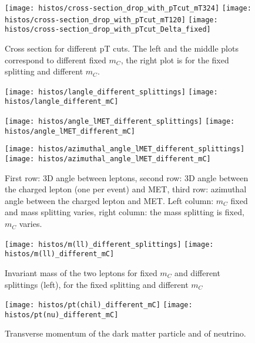 \documentclass[10pt,letterpaper,notitlepage]{article}
\begin{document}
\begin{figure}[H]
\centering

\texttt{[image: histos/cross-section\_drop\_with\_pTcut\_mT324]}
\texttt{[image: histos/cross-section\_drop\_with\_pTcut\_mT120]}
\texttt{[image: histos/cross-section\_drop\_with\_pTcut\_Delta\_fixed]}

\caption{\label{fig:sigma-pTcut}Cross section for different pT cuts. The left and the middle plots correspond to different fixed $m_C$, the right plot is for the fixed splitting and different $m_C$.}
\end{figure}


\begin{figure}[H]
\centering

\texttt{[image: histos/langle\_different\_splittings]}
\texttt{[image: histos/langle\_different\_mC]}

\texttt{[image: histos/angle\_lMET\_different\_splittings]}
\texttt{[image: histos/angle\_lMET\_different\_mC]}

\texttt{[image: histos/azimuthal\_angle\_lMET\_different\_splittings]}
\texttt{[image: histos/azimuthal\_angle\_lMET\_different\_mC]}


\caption{\label{fig:angles}First row: 3D angle between leptons, second row: 3D angle between the charged lepton (one per event) and MET, third row: azimuthal angle between the charged lepton and MET. Left column: $m_C$ fixed and mass splitting varies, right column: the mass splitting is fixed, $m_C$ varies.}
\end{figure}



\begin{figure}[H]
\centering

\texttt{[image: histos/m(ll)\_different\_splittings]}
\texttt{[image: histos/m(ll)\_different\_mC]}

\caption{\label{fig:inv-mass}Invariant mass of the two leptons for fixed $m_C$ and different splittings (left), for the fixed splitting and different $m_C$}
\end{figure}



\begin{figure}[H]
\centering

\texttt{[image: histos/pt(chil)\_different\_mC]}
\texttt{[image: histos/pt(nu)\_different\_mC]}

\caption{\label{fig:additional-distr}Transverse momentum of the dark matter particle and of neutrino.}
\end{figure}
\end{document}
